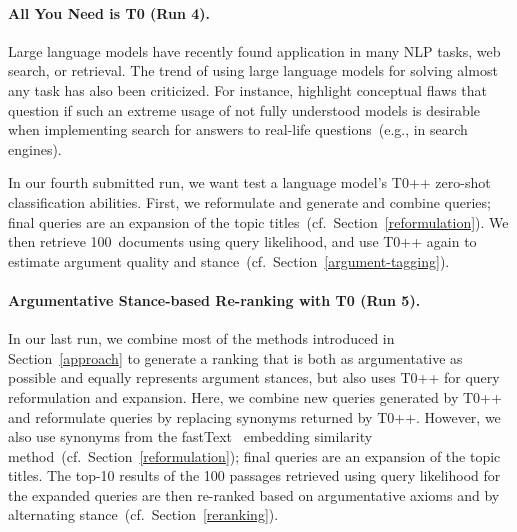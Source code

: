 \paragraph{All You Need is T0 (Run 4).}

Large language models have recently found application in many NLP tasks, web search, or retrieval. The trend of using large language models for solving almost any task has also been criticized. For instance, \citet{ShahB2022} highlight conceptual flaws that question if such an extreme usage of not fully understood models is desirable when implementing search for answers to real-life questions~(e.g., in search engines).

In our fourth submitted run, we want test a language model's T0++ zero-shot classification abilities. First, we reformulate and generate and combine queries; final queries are an expansion of the topic titles~(cf.\ Section~\ref{reformulation}).
We then retrieve 100~documents using query likelihood, and use T0++ again to estimate argument quality and stance~(cf.\ Section~\ref{argument-tagging}).

\paragraph{Argumentative Stance-based Re-ranking with T0 (Run 5).}

In our last run, we combine most of the methods introduced in Section~\ref{approach} to generate a ranking that is both as argumentative as possible and equally represents argument stances, but also uses T0++ for query reformulation and expansion.
Here, we combine new queries generated by T0++ and reformulate queries by replacing synonyms returned by T0++. However, we also use synonyms from the fastText~\cite{BojanowskiGJM2017} embedding similarity method~(cf.\ Section~\ref{reformulation}); final queries are an expansion of the topic titles.
The top-10 results of the 100 passages retrieved using query likelihood for the expanded queries are then re-ranked based on argumentative axioms and by alternating stance~(cf.\ Section~\ref{reranking}).
